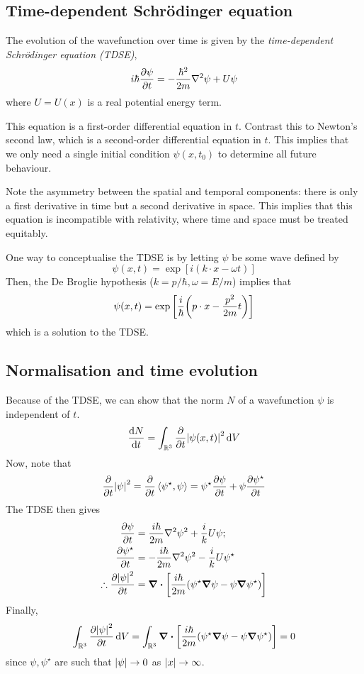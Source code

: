 \subsection{Time-dependent Schr\"odinger equation}
\begin{definition}
	The evolution of the wavefunction over time is given by the \textit{time-dependent Schr\"odinger equation (TDSE)},
	\[
		i\hbar \pdv{\psi}{t} = -\frac{\hbar^2}{2m} \laplacian \psi + U \psi
	\]
	where \( U = U(x) \) is a real potential energy term.
\end{definition}
\begin{remark}
	This equation is a first-order differential equation in \( t \).
	Contrast this to Newton's second law, which is a second-order differential equation in \( t \).
	This implies that we only need a single initial condition \( \psi(x,t_0) \) to determine all future behaviour.
\end{remark}
\begin{remark}
	Note the asymmetry between the spatial and temporal components: there is only a first derivative in time but a second derivative in space.
	This implies that this equation is incompatible with relativity, where time and space must be treated equitably.
\end{remark}
\noindent One way to conceptualise the TDSE is by letting \( \psi \) be some wave defined by
\[
	\psi(x,t) = \exp[ i(k \cdot x - \omega t) ]
\]
Then, the De Broglie hypothesis (\( k = p/\hbar, \omega = E/m \)) implies that
\[
	\psi(x,t) = \exp\qty[\frac{i}{\hbar}\qty(p \cdot x - \frac{p^2}{2m}t)]
\]
which is a solution to the TDSE.\@

\subsection{Normalisation and time evolution}
Because of the TDSE, we can show that the norm \( N \) of a wavefunction \( \psi \) is independent of \( t \).
\[
	\dv{N}{t} = \int_{\mathbb R^3} \pdv{t} \abs{\psi(x,t)}^2 \dd{V}
\]
Now, note that
\[
	\pdv{t} \abs{\psi}^2 = \pdv{t} \left\langle{\psi^\star, \psi}\right\rangle = \psi^\star \pdv{\psi}{t} + \psi \pdv{\psi^\star}{t}
\]
The TDSE then gives
\begin{align*}
	\pdv{\psi}{t}                    & = \frac{i \hbar}{2m} \laplacian \psi^2 + \frac{i}{k} U \psi;                   \\
	\pdv{\psi^\star}{t}              & = - \frac{i \hbar}{2m} \laplacian \psi^2 - \frac{i}{k} U \psi^\star            \\
	\therefore \pdv{\abs{\psi}^2}{t} & = \div[\frac{i\hbar}{2m}\qty(\psi^\star \grad{\psi} - \psi \grad{\psi^\star})]
\end{align*}
Finally,
\[
	\int_{\mathbb R^3} \pdv{\abs{\psi}^2}{t} \dd{V} = \int_{\mathbb R^3} \div[ \frac{i\hbar}{2m}\qty(\psi^\star \grad{\psi} - \psi \grad{\psi^\star}) ] = 0
\]
since \( \psi, \psi^\star \) are such that \( \abs{\psi} \to 0 \) as \( \abs{x} \to \infty \).

